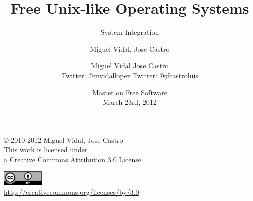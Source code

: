 \documentclass{beamer}
\begin{document}
\title{Free Unix-like Operating Systems}
\subtitle{System Integration}
\author{Miguel Vidal, Jose Castro} 
\date{\footnotesize{Master on Free Software \\ March 23rd, 2012}}
\author{Miguel Vidal \hspace{1cm} Jose Castro \\
\hspace{0.5mm} {\tiny Twitter: @mvidallopez \hspace{1.1cm}Twitter: @jfcastroluis}
}



\begin{frame}
  \vspace{2cm}
  \begin{flushright}
    {\small \copyright{} 2010-2012 Miguel Vidal, Jose Castro} \\
    \medskip
    {\scriptsize This work is licensed under \\ a Creative Commons Attribution 3.0 License}
  \end{flushright}
  \begin{flushright}
    \href{http://creativecommons.org/licenses/by/3.0/es}{\includegraphics[width=2cm]{format/cc-by.png}} \\
    {\tiny \url{http://creativecommons.org/licenses/by/3.0}}
  \end{flushright}
\end{frame}%

\usebackgroundtemplate{}

\end{document}
